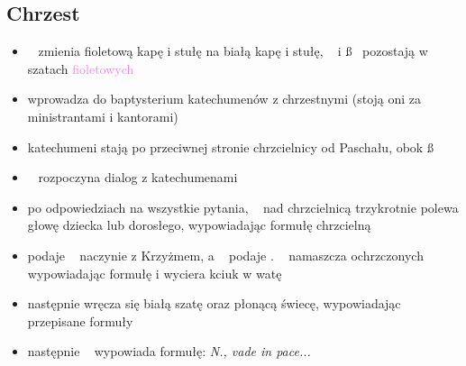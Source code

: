 \subsection{Chrzest}
\begin{itemize}
	\item \ii~ zmienia {\color{violet} fioletową kapę i stułę} na
	      \textcolor{black!50}{białą kapę i stułę}, \dd~ i \ss~ pozostają w
	      szatach \textcolor{violet}{fioletowych}
	\item {} wprowadza do baptysterium katechumenów z chrzestnymi (stoją oni
	      za ministrantami i kantorami)
	\item katechumeni stają po przeciwnej stronie chrzcielnicy od Paschału, obok
	      \ss
	\item \ii~ rozpoczyna dialog z katechumenami
	\item po odpowiedziach na wszystkie pytania, \ii~ nad chrzcielnicą
	      trzykrotnie polewa głowę dziecka lub dorosłego, wypowiadając formułę
	      chrzcielną
	\item {} podaje \dd~ naczynie z Krzyżmem, a \dd~ podaje \ii. \ii~
	      namaszcza ochrzczonych wypowiadając formułę i wyciera kciuk w watę
	\item następnie wręcza się białą szatę oraz płonącą świecę, wypowiadając
	      przepisane formuły
	\item następnie \ii~ wypowiada formułę: \textit{N., vade in pace...}
\end{itemize}
